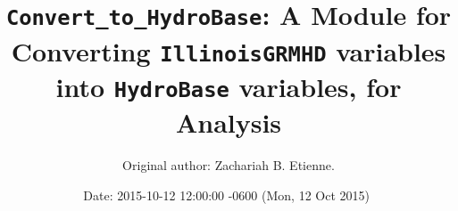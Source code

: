 \documentclass{article}
\begin{document}
\title{{\tt Convert\_to\_HydroBase}: A Module for Converting {\tt IllinoisGRMHD} variables into {\tt HydroBase} variables, for Analysis}

\author{Original author: Zachariah B. Etienne. }

\date{$ $Date: 2015-10-12 12:00:00 -0600 (Mon, 12 Oct 2015) $ $}
\maketitle

%
%  
%                                                    
\end{document}
